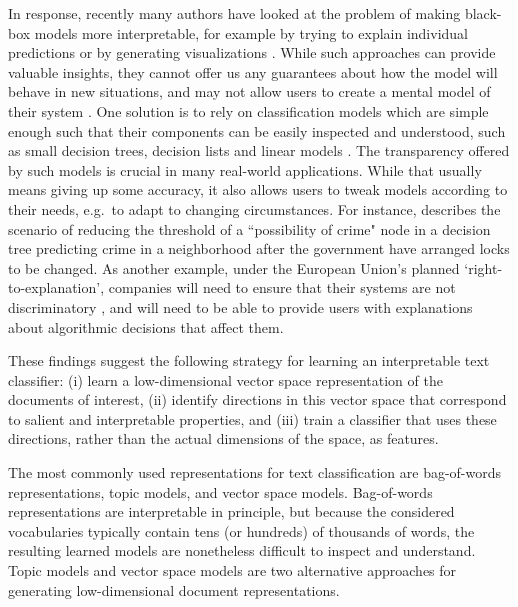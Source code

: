 
In response, recently many authors have looked at the problem of making black-box models more interpretable, for example by trying to explain individual predictions \cite{Arras2017,Ribeiro2016} or by generating visualizations \cite{Dou2013,Li2016a,Chaney2012}.
While such approaches can provide valuable insights, they cannot offer us any guarantees about how the model will behave in new situations, and may not allow users to create a mental model of their system \cite{Kayande2009}.  One solution is to rely on classification models which are simple enough such that their components can be easily inspected and understood, such as small decision trees, decision lists and linear models \cite{Ustun2014}. The transparency offered by such models is crucial in many real-world applications. While that usually means giving up some accuracy, it also allows users to tweak models according to their needs, e.g.\ to adapt to changing circumstances. For instance, \cite{Veale2017} describes the scenario of reducing the threshold of a ``possibility of crime" node in a decision tree predicting crime in a neighborhood after the government have arranged locks to be changed. As another example, under the European Union's planned `right-to-explanation', companies will need to ensure that their systems are not discriminatory \cite{Goodman2016}, and will need to be able to provide users with explanations about algorithmic decisions that affect them.

These findings suggest the following strategy for learning an interpretable text classifier: (i) learn a low-dimensional vector space representation of the documents of interest, (ii) identify directions in this vector space that correspond to salient and interpretable properties, and (iii) train a classifier that uses these directions, rather than the actual dimensions of the space, as features. 


The most commonly used representations for text classification are bag-of-words representations, topic models, and vector space models. Bag-of-words representations are interpretable in principle, but because the considered vocabularies typically contain tens (or hundreds) of thousands of words, the resulting learned models are nonetheless difficult to inspect and understand. Topic models and vector space models are two alternative approaches for generating low-dimensional document representations.

